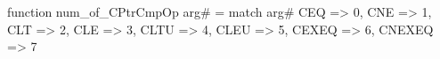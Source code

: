function num_of_CPtrCmpOp arg# = match arg# {
  CEQ => 0,
  CNE => 1,
  CLT => 2,
  CLE => 3,
  CLTU => 4,
  CLEU => 5,
  CEXEQ => 6,
  CNEXEQ => 7
}
